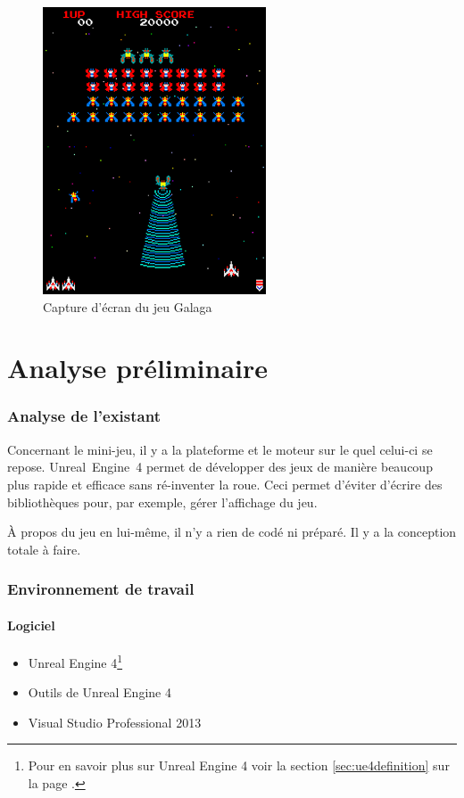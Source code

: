 \documentclass[11pt, a4paper, oneside]{article}
\begin{document}
\begin{figure}[h]
	\begin{center}
	\includegraphics[scale=0.8]{Galaga}
	\caption{Capture d'écran du jeu Galaga}
	\end{center}
\end{figure}

\newpage
\part{Analyse préliminaire}
\section{Analyse de l'existant}
Concernant le mini-jeu, il y a la plateforme et le moteur sur le quel celui-ci se repose. \mbox{Unreal Engine 4} permet de développer des jeux de manière beaucoup plus rapide et efficace sans ré-inventer la roue. Ceci permet d'éviter d'écrire des bibliothèques pour, par exemple, gérer l'affichage du jeu.

À propos du jeu en lui-même, il n'y a rien de codé ni préparé. Il y a la conception totale à faire.
\section{Environnement de travail}
\subsection{Logiciel}
\begin{itemize}
\item Unreal Engine 4\footnote{Pour en savoir plus sur Unreal Engine 4 voir la section \ref{sec:ue4definition} sur la page \pageref{sec:ue4definition}.}
\item Outils de Unreal Engine 4
\item Visual Studio Professional 2013\\
\end{itemize}
\end{document}
